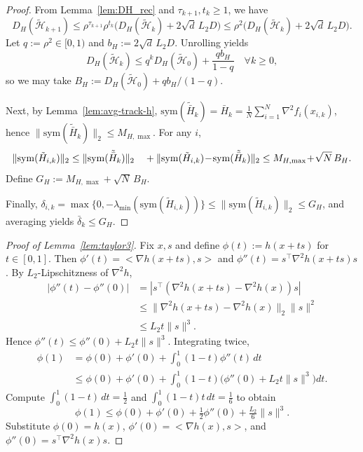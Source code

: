 \documentclass[11pt,a4paper]{article}
\def\ip#1#2{<#1,#2>}%
\newcommand{\ip}[2]{\left\langle #1,#2\right\rangle}
\begin{document}
\begin{proof}
From Lemma~\ref{lem:DH_rec} and $\tau_{k+1},t_k\ge 1$, we have
\[
D_H(\tilde{\mathcal H}_{k+1})
\le \rho^{\tau_{k+1}}\rho^{t_k}\Big(D_H(\tilde{\mathcal H}_k)+2\sqrt d\,L_2D\Big)
\le \rho^2\Big(D_H(\tilde{\mathcal H}_k)+2\sqrt d\,L_2D\Big).
\]
Let $q:=\rho^2\in[0,1)$ and $b_H:=2\sqrt d\,L_2D$. Unrolling yields
\[
D_H(\tilde{\mathcal H}_k)\le q^k D_H(\tilde{\mathcal H}_0)+\frac{qb_H}{1-q}\quad \forall k\ge 0,
\]
so we may take $B_H:=D_H(\tilde{\mathcal H}_0)+qb_H/(1-q)$.

Next, by Lemma~\ref{lem:avg-track-h},
$\mathrm{sym}(\tilde{\bar H}_k)=\bar H_k=\frac1N\sum_{i=1}^N\nabla^2 f_i(x_{i,k})$,
hence $\|\mathrm{sym}(\tilde{\bar H}_k)\|_2\le M_{H,\max}$.
For any $i$,
\[
\|\mathrm{sym}(\tilde H_{i,k})\|_2
\le \|\mathrm{sym}(\tilde{\bar H}_k)\|_2\\
\quad + \|\mathrm{sym}(\tilde H_{i,k})\!-\!\mathrm{sym}(\tilde{\bar H}_k)\|_2
\le M_{H,\max}\!+\!\sqrt{N}\,B_H.
\]
Define $G_H:=M_{H,\max} + \sqrt{N}\,B_H$.

Finally, $\delta_{i,k}=\max\{0,-\lambda_{\min}(\mathrm{sym}(\tilde H_{i,k}))\}
\le \|\mathrm{sym}(\tilde H_{i,k})\|_2\le G_H$,
and averaging yields $\bar\delta_k\le G_H$.
\end{proof}

\begin{proof}[Proof of Lemma~\ref{lem:taylor3}]
Fix $x,s$ and define $\phi(t):=h(x+ts)$ for $t\in[0,1]$.
Then $\phi'(t)=\ip{\nabla h(x+ts)}{s}$ and $\phi''(t)=s^\top\nabla^2 h(x+ts)s$.
By $L_2$-Lipschitzness of $\nabla^2 h$,
\begin{align*}
|\phi''(t)\!-\!\phi''(0)|
&=|s^\top(\nabla^2 h(x\!+\!ts)\!-\!\nabla^2 h(x))s|\\
&\le \|\nabla^2 h(x\!+\!ts)\!-\!\nabla^2 h(x)\|_2\|s\|^2\\
&\le L_2 t\|s\|^3.
\end{align*}
Hence $\phi''(t)\le \phi''(0)+L_2 t\|s\|^3$.
Integrating twice,
\begin{align*}
\phi(1)&=\phi(0)+\phi'(0)+\int_0^1\!(1\!-\!t)\phi''(t)\,dt\\
&\le \phi(0)+\phi'(0)+\!\int_0^1\!(1\!-\!t)\big(\phi''(0)+L_2 t\|s\|^3\big)dt.
\end{align*}
Compute $\int_0^1(1-t)\,dt=\tfrac12$ and $\int_0^1(1-t)t\,dt=\tfrac16$ to obtain
\[
\phi(1)\le \phi(0)+\phi'(0)+\tfrac12\phi''(0)+\tfrac{L_2}{6}\|s\|^3.
\]
Substitute $\phi(0)=h(x)$, $\phi'(0)=\ip{\nabla h(x)}{s}$, and $\phi''(0)=s^\top\nabla^2 h(x)s$.
\end{proof}
\end{document}

